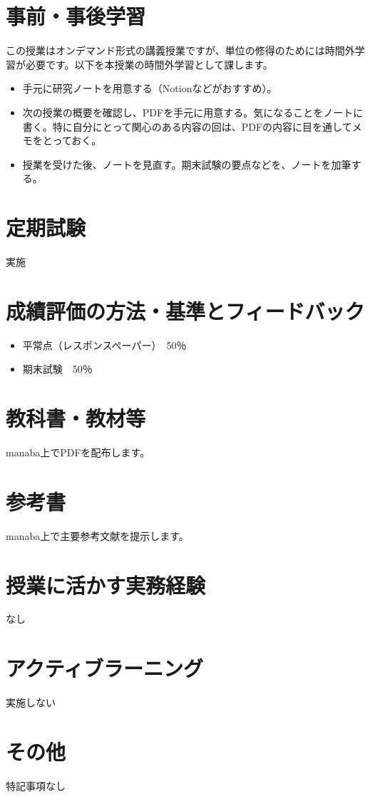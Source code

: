 \documentclass{jlreq}
\begin{document}
\begin{multicols}{2}
\section*{事前・事後学習}
この授業はオンデマンド形式の講義授業ですが、単位の修得のためには時間外学習が必要です。以下を本授業の時間外学習として課します。
\begin{itemize}
    \item 手元に研究ノートを用意する（Notionなどがおすすめ）。
    \item 次の授業の概要を確認し、PDFを手元に用意する。気になることをノートに書く。特に自分にとって関心のある内容の回は、PDFの内容に目を通してメモをとっておく。
    \item 授業を受けた後、ノートを見直す。期末試験の要点などを、ノートを加筆する。
\end{itemize}

\section*{定期試験}
実施

\section*{成績評価の方法・基準とフィードバック}
\begin{itemize}
    \item 平常点（レスポンスペーパー）　50％
    \item 期末試験　50％
\end{itemize}

\section*{教科書・教材等}
manaba上でPDFを配布します。

\section*{参考書}
manaba上で主要参考文献を提示します。

\section*{授業に活かす実務経験}
なし

\section*{アクティブラーニング}
実施しない

\section*{その他}
特記事項なし

\end{multicols}
\end{document}
